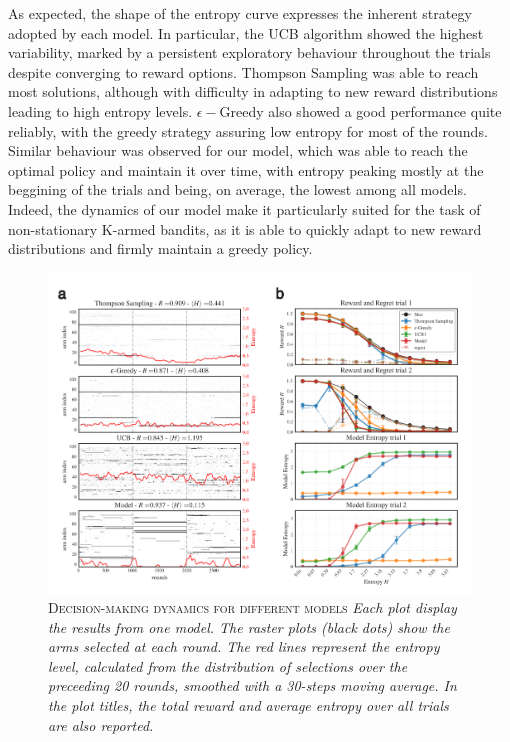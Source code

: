 As expected, the shape of the entropy curve expresses the inherent strategy adopted by each model.
In particular, the UCB algorithm showed the highest variability, marked by a persistent exploratory behaviour throughout the trials despite converging to reward options. Thompson Sampling was able to reach most solutions, although with difficulty in adapting to new reward distributions
leading to high entropy levels.
$\epsilon-$Greedy also showed a good performance quite reliably, with the greedy strategy assuring low entropy for most of the rounds.
Similar behaviour was observed for our model, which was able to reach the optimal policy and maintain it over time, with entropy peaking mostly at the beggining of the trials and being, on average, the lowest among all models.
Indeed, the dynamics of our model make it particularly suited for the task of non-stationary K-armed bandits, as it is able to quickly adapt to new reward distributions and firmly maintain a greedy policy.

\begin{figure}[H]
    \centering
    \includegraphics[width=1.0\textwidth]{figures/entropy_main_plot.png}
    \caption{\textsc{Decision-making dynamics for different models} \textit{Each plot display the results from one model. The raster plots (black dots) show the arms selected at each round.
The red lines represent the entropy level, calculated from the distribution of selections over the preceeding 20 rounds, smoothed with a 30-steps moving average. In the plot titles, the total reward and average entropy over all trials are also reported.}}
    \label{fig:entropy_fig1}
\end{figure}


